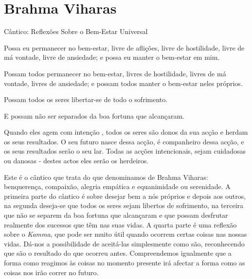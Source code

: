 \chapter{Brahma Viharas}

{\centering\sectionFont\sectionSize
Cântico: Reflexões Sobre o Bem-Estar Universal
\par}

{\itshape
\setlength{\parskip}{0.5\baselineskip}%
\setlength{\parindent}{0pt}%

Possa eu permanecer no bem-estar, livre de aflições, livre de hostilidade,
livre de má vontade, livre de ansiedade; e possa eu manter o bem-estar em mim.

Possam todos permanecer no bem-estar, livres de hostilidade, livres de má
vontade, livres de ansiedade; e possam todos manter o bem-estar neles
próprios.

Possam todos os seres libertar-se de todo o sofrimento.

E possam não ser separados da boa fortuna que alcançaram.

Quando eles agem com intenção , todos os seres são donos da sua acção e herdam
os seus resultados. O seu futuro nasce dessa acção, é companheiro dessa acção,
e os seus resultados serão o seu lar. Todas as acções intencionais, sejam
cuidadosas ou danosas - destes actos eles serão os herdeiros.

}

\bigskip

Este é o cântico que trata do que denominamos de Brahma Viharas:
benquerença, compaixão, alegria empática e equanimidade ou serenidade. A
primeira parte do cântico é sobre desejar bem a nós próprios e depois
aos outros, na segunda deseja-se que todos os seres sejam libertos de
sofrimento, na terceira que não se separem da boa fortuna que alcançaram
e que possam desfrutar realmente dos sucessos que têm nas suas vidas. A
quarta parte é uma reflexão sobre o \emph{Kamma}, que pode ser muito
útil quando ocorrem certas coisas nas nossas vidas. Dá-nos a
possibilidade de aceitá-las simplesmente como são, reconhecendo que são
o resultado do que ocorreu antes. Compreendemos igualmente que a forma
como reagimos às coisas no momento presente irá afectar a forma como as
coisas nos irão correr no futuro.

